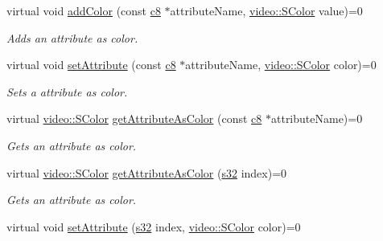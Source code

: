 \begin{DoxyCompactItemize}
\mbox{\label{classirr_1_1io_1_1IAttributes_ac21b8b746405ed42429bc4f2a56d7b93}} 
virtual void \hyperlink{classirr_1_1io_1_1IAttributes_ac21b8b746405ed42429bc4f2a56d7b93}{add\+Color} (const \hyperlink{namespaceirr_a9395eaea339bcb546b319e9c96bf7410}{c8} $\ast$attribute\+Name, \hyperlink{classirr_1_1video_1_1SColor}{video\+::\+S\+Color} value)=0
\begin{DoxyCompactList}\small\item\em Adds an attribute as color. \end{DoxyCompactList}\item 
\mbox{\label{classirr_1_1io_1_1IAttributes_afee757df879cb6bac464ae5000caf386}} 
virtual void \hyperlink{classirr_1_1io_1_1IAttributes_afee757df879cb6bac464ae5000caf386}{set\+Attribute} (const \hyperlink{namespaceirr_a9395eaea339bcb546b319e9c96bf7410}{c8} $\ast$attribute\+Name, \hyperlink{classirr_1_1video_1_1SColor}{video\+::\+S\+Color} color)=0
\begin{DoxyCompactList}\small\item\em Sets a attribute as color. \end{DoxyCompactList}\item 
virtual \hyperlink{classirr_1_1video_1_1SColor}{video\+::\+S\+Color} \hyperlink{classirr_1_1io_1_1IAttributes_a72b576b9ba7332952cdb86c60dae2fee}{get\+Attribute\+As\+Color} (const \hyperlink{namespaceirr_a9395eaea339bcb546b319e9c96bf7410}{c8} $\ast$attribute\+Name)=0
\begin{DoxyCompactList}\small\item\em Gets an attribute as color. \end{DoxyCompactList}\item 
virtual \hyperlink{classirr_1_1video_1_1SColor}{video\+::\+S\+Color} \hyperlink{classirr_1_1io_1_1IAttributes_ac3ef831227f7c9383e3e9144ae877c60}{get\+Attribute\+As\+Color} (\hyperlink{namespaceirr_ac66849b7a6ed16e30ebede579f9b47c6}{s32} index)=0
\begin{DoxyCompactList}\small\item\em Gets an attribute as color. \end{DoxyCompactList}\item 
\mbox{\label{classirr_1_1io_1_1IAttributes_a852d8937c6dafe90f290c1a0322cacf7}} 
virtual void \hyperlink{classirr_1_1io_1_1IAttributes_a852d8937c6dafe90f290c1a0322cacf7}{set\+Attribute} (\hyperlink{namespaceirr_ac66849b7a6ed16e30ebede579f9b47c6}{s32} index, \hyperlink{classirr_1_1video_1_1SColor}{video\+::\+S\+Color} color)=0

\end{DoxyCompactItemize}
